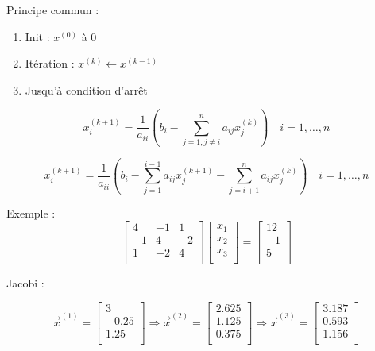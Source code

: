 
Principe commun : 

\begin{enumerate}
    \item Init : $x^{(0)}$ à 0 
    \item Itération : $x^{(k)} \leftarrow x^{(k-1)}$
    \item Jusqu'à condition d'arrêt
\end{enumerate}


$$x_i^{(k+1)} = \frac{1}{a_{ii}} \left( b_i - \sum_{j=1, j\neq i}^n a_{ij} x_j^{(k)} \right) \quad i=1,\dots,n$$



$$x_i^{(k+1)} = \frac{1}{a_{ii}} \left( b_i - \sum_{j=1}^{i-1} a_{ij} x_j^{(k+1)} - \sum_{j=i+1}^n a_{ij} x_j^{(k)} \right) \quad i=1,\dots,n$$

Exemple :
\[
\begin{bmatrix}
    4&-1&1 \\
    -1&4&-2 \\
    1&-2&4\\ 
\end{bmatrix}
\begin{bmatrix}
    x_1 \\
    x_2 \\
    x_3 \\
\end{bmatrix}
=
\begin{bmatrix}
    12 \\
    -1 \\
    5 \\
\end{bmatrix}
\]

Jacobi :

\[
\vec{x}^{(1)} = \begin{bmatrix}
    3 \\
    -0.25 \\
    1.25 \\
\end{bmatrix}
\Rightarrow
\vec{x}^{(2)} = \begin{bmatrix}
    2.625 \\
    1.125 \\
    0.375 \\
\end{bmatrix}
\Rightarrow
\vec{x}^{(3)} = \begin{bmatrix}
    3.187 \\
    0.593 \\
    1.156 \\
\end{bmatrix}
\]

